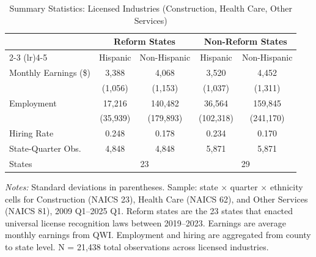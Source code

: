 \begin{table}[H]
\centering
\caption{Summary Statistics: Licensed Industries (Construction, Health Care, Other Services)}
\label{tab:summary}
\begin{threeparttable}
\begin{tabular}{lcccc}
\toprule
 & \multicolumn{2}{c}{Reform States} & \multicolumn{2}{c}{Non-Reform States} \\
\cmidrule(lr){2-3} \cmidrule(lr){4-5}
 & Hispanic & Non-Hispanic & Hispanic & Non-Hispanic \\
\midrule
Monthly Earnings (\$) & 3,388 & 4,068 & 3,520 & 4,452 \\
 & (1,056) & (1,153) & (1,037) & (1,311) \\
Employment & 17,216 & 140,482 & 36,564 & 159,845 \\
 & (35,939) & (179,893) & (102,318) & (241,170) \\
Hiring Rate & 0.248 & 0.178 & 0.234 & 0.170 \\
\midrule
State-Quarter Obs. & 4,848 & 4,848 & 5,871 & 5,871 \\
States & \multicolumn{2}{c}{23} & \multicolumn{2}{c}{29} \\
\bottomrule
\end{tabular}
\begin{tablenotes}[flushleft]
\small
\item \textit{Notes:} Standard deviations in parentheses. Sample: state $\times$ quarter $\times$ ethnicity cells for Construction (NAICS 23), Health Care (NAICS 62), and Other Services (NAICS 81), 2009 Q1--2025 Q1. Reform states are the 23 states that enacted universal license recognition laws between 2019--2023. Earnings are average monthly earnings from QWI. Employment and hiring are aggregated from county to state level. N = 21,438 total observations across licensed industries.
\end{tablenotes}
\end{threeparttable}
\end{table}
